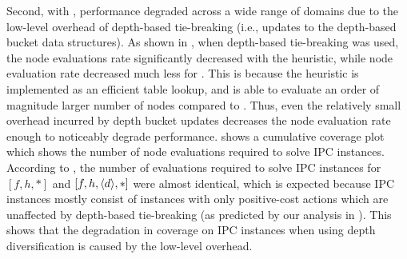Second, with \mands, performance degraded across a wide range of domains due to the low-level overhead of depth-based tie-breaking (i.e., updates to the depth-based bucket data structures).
As shown in , when depth-based tie-breaking was used, the node evaluations rate significantly decreased with the \mands heuristic, 
while node evaluation rate decreased much less for \lmcut.
This is because  the \mands heuristic is implemented
as an efficient table lookup, and \mands is able to evaluate an order of magnitude larger number of nodes compared to \lmcut.
Thus, even the relatively small overhead incurred by depth bucket updates decreases the node evaluation rate enough to noticeably degrade \mands performance.
 shows a cumulative coverage plot which shows the number of node evaluations
required to solve IPC instances.
% 
According to , the number of evaluations required to solve IPC instances
for  $[f,h,*]$ and $[f,h,{\left<d\right>},*]$ were almost identical, which is expected because
IPC instances mostly consist of instances with only positive-cost actions which are unaffected by depth-based tie-breaking (as predicted by our analysis in ).
This shows that the degradation in coverage on IPC instances when using depth diversification is caused by the low-level overhead. %
% 

